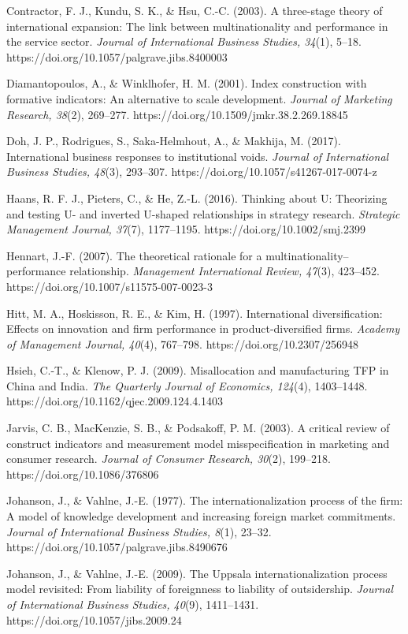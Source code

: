 \documentclass[
  12pt,a4paper]{article}
\begin{document}
Contractor, F. J., Kundu, S. K., \& Hsu, C.-C. (2003). A three-stage
theory of international expansion: The link between multinationality and
performance in the service sector. \emph{Journal of International
Business Studies, 34}(1), 5--18.
https://doi.org/10.1057/palgrave.jibs.8400003

Diamantopoulos, A., \& Winklhofer, H. M. (2001). Index construction with
formative indicators: An alternative to scale development. \emph{Journal
of Marketing Research, 38}(2), 269--277.
https://doi.org/10.1509/jmkr.38.2.269.18845

Doh, J. P., Rodrigues, S., Saka-Helmhout, A., \& Makhija, M. (2017).
International business responses to institutional voids. \emph{Journal
of International Business Studies, 48}(3), 293--307.
https://doi.org/10.1057/s41267-017-0074-z

Haans, R. F. J., Pieters, C., \& He, Z.-L. (2016). Thinking about U:
Theorizing and testing U- and inverted U-shaped relationships in
strategy research. \emph{Strategic Management Journal, 37}(7),
1177--1195. https://doi.org/10.1002/smj.2399

Hennart, J.-F. (2007). The theoretical rationale for a
multinationality--performance relationship. \emph{Management
International Review, 47}(3), 423--452.
https://doi.org/10.1007/s11575-007-0023-3

Hitt, M. A., Hoskisson, R. E., \& Kim, H. (1997). International
diversification: Effects on innovation and firm performance in
product-diversified firms. \emph{Academy of Management Journal, 40}(4),
767--798. https://doi.org/10.2307/256948

Hsieh, C.-T., \& Klenow, P. J. (2009). Misallocation and manufacturing
TFP in China and India. \emph{The Quarterly Journal of Economics,
124}(4), 1403--1448. https://doi.org/10.1162/qjec.2009.124.4.1403

Jarvis, C. B., MacKenzie, S. B., \& Podsakoff, P. M. (2003). A critical
review of construct indicators and measurement model misspecification in
marketing and consumer research. \emph{Journal of Consumer Research,
30}(2), 199--218. https://doi.org/10.1086/376806

Johanson, J., \& Vahlne, J.-E. (1977). The internationalization process
of the firm: A model of knowledge development and increasing foreign
market commitments. \emph{Journal of International Business Studies,
8}(1), 23--32. https://doi.org/10.1057/palgrave.jibs.8490676

Johanson, J., \& Vahlne, J.-E. (2009). The Uppsala internationalization
process model revisited: From liability of foreignness to liability of
outsidership. \emph{Journal of International Business Studies, 40}(9),
1411--1431. https://doi.org/10.1057/jibs.2009.24
\end{document}
